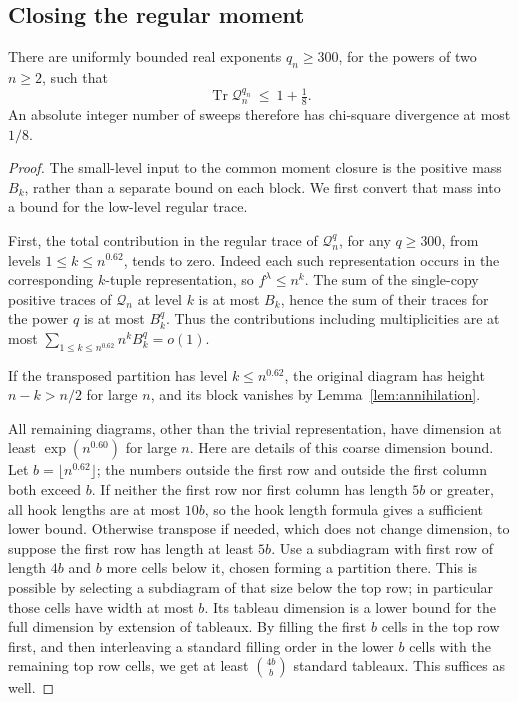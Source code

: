 \subsection{Closing the regular moment}
\begin{theorem}\label{tra:collision-series:moment}
\label{tra:collision-series:main-statement}
There are uniformly bounded real exponents \(q_n\ge 300\), for the powers of two \(n\ge 2\), such that
\begin{equation}
\operatorname{Tr} \mathcal Q_n^{q_n}\ \le\ 1+\tfrac18. \label{tra:collision-series:eq1}
\end{equation}
An absolute integer number of sweeps therefore has chi-square divergence at most $1/8$.
\end{theorem}
\begin{proof}
\label{tra:collision-series:bounded-exponents-and-completion}
The small-level input to the common moment closure is the positive
mass $B_k$, rather than a separate bound on each block. We first
convert that mass into a bound for the low-level regular trace.

First, the total contribution in the regular trace of \(\mathcal Q_n^q\), for any \(q\ge 300\), from levels \(1\le k\le n^{0.62}\), tends to zero. Indeed each such representation occurs in the corresponding \(k\)-tuple representation, so \(f^\lambda\le n^k\). The sum of the single-copy positive traces of \(\mathcal Q_n\) at level \(k\) is at most \(B_k\), hence the sum of their traces for the power \(q\) is at most \(B_k^q\). Thus the contributions including multiplicities are at most \(\sum_{1\le k\le n^{0.62}} n^k B_k^q=o(1)\).

If the transposed partition has level $k\le n^{0.62}$,
the original diagram has height $n-k>n/2$ for large $n$, and its
block vanishes by Lemma~\ref{lem:annihilation}.

All remaining diagrams, other than the trivial representation, have dimension at least \(\exp(n^{0.60})\) for large \(n\). Here are details of this coarse dimension bound. Let \(b=\lfloor n^{0.62}\rfloor\); the numbers outside the first row and outside the first column both exceed \(b\). If neither the first row nor first column has length \(5b\) or greater, all hook lengths are at most \(10b\), so the hook length formula gives a sufficient lower bound. Otherwise transpose if needed, which does not change dimension, to suppose the first row has length at least \(5b\). Use a subdiagram with first row of length \(4b\) and \(b\) more cells below it, chosen forming a partition there. This is possible by selecting a subdiagram of that size below the top row; in particular those cells have width at most \(b\). Its tableau dimension is a lower bound for the full dimension by extension of tableaux. By filling the first \(b\) cells in the top row first, and then interleaving a standard filling order in the lower \(b\) cells with the remaining top row cells, we get at least \(\binom{4b}b\) standard tableaux. This suffices as well.


\end{proof}
